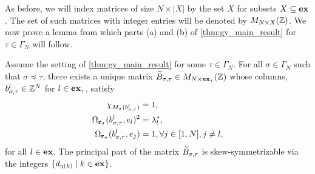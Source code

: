 As before, we will index matrices of size $N \times |X|$ by the set $X$ for subsets $X
	\subseteq \mathbf{ex}$. The set of such matrices with integer entries will be denoted by $M_{N
			\times X}(\mathbb{Z})$. We now prove a lemma from which parts (a) and (b) of
\cref{thm:gy_main_result} for $\tau \in \Gamma_N$ will follow.

\begin{lemma}\label{lem:inductive_columns}
	Assume the setting of \cref{thm:gy_main_result} for some $\tau \in \Gamma_N$. For all $\sigma \in \Gamma_N$ such that $\sigma \preceq \tau$, there exists a unique matrix $\widetilde{B}_{\sigma, \tau}\in M_{N \times \mathbf{ex}_\tau} (\mathbb{Z})$ whose columns, $b^l_{\sigma, \tau} \in \mathbb{Z}^N$ for $l\in \mathbf{ex}_\tau$, satisfy
	\begin{equation}\label{eq:conditions_for_blsigmatau}
		\begin{aligned}
			\chi_{M_\sigma(b^l_{\sigma, \tau})}            & = 1,                                \\
			\Omega_{\mathbf{r}_\sigma}(b^l_{\sigma,\tau}, e_l)^2 & = \lambda^*_l,                      \\
			\Omega_{\mathbf{r}_\sigma}(b^l_{\sigma,\tau}, e_j)   & = 1, \forall j \in [1, N], j\neq l,
		\end{aligned}
	\end{equation}
	for all $l \in \mathbf{ex}$. The principal part of the matrix $\widetilde{B}_{\sigma, \tau}$ is
	skew-symmetrizable via the integers $\{d_{\eta(k)} \mid k \in \mathbf{ex}\}$.
\end{lemma}

